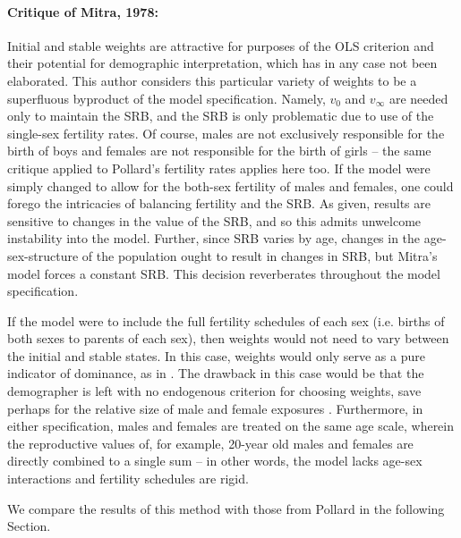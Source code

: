 \paragraph{Critique of Mitra, 1978: } Initial and stable weights are attractive
for purposes of the OLS criterion and their potential for demographic interpretation, which has in any
case not been elaborated. This author considers this particular variety of
weights to be a superfluous byproduct of the model specification. Namely, $v_0$
and $v_\infty$ are needed only to maintain the SRB, and the SRB is
only problematic due to use of the single-sex fertility rates. Of course, males
are not exclusively responsible for the birth of boys and females are not 
responsible for the birth of girls -- the same critique applied to Pollard's
fertility rates applies here too. If the model were simply changed to allow for
the both-sex fertility of males and females, one could forego the
intricacies of balancing fertility and the SRB. As given, results are
sensitive to changes in the value of the SRB, and so this admits
unwelcome instability into the model. Further, since SRB varies by age,
changes in the age-sex-structure of the population ought to result in changes in
SRB, but Mitra's model forces a constant SRB. This decision reverberates
throughout the model specification.

If the model were to include the full fertility schedules of each sex (i.e.
births of both sexes to parents of each sex), then weights would not need to
vary between the initial and stable states. In this case, weights would only serve as a pure indicator of
dominance, as in \citet{goodman1967age}. The drawback in this case would be
that the demographer is left with no endogenous criterion for choosing weights, save
perhaps for the relative size of male and female exposures \citep{mitra1976effect}. 
Furthermore, in either specification, males and females are treated on the same 
age scale, wherein the reproductive values of, for example, 20-year old males
and females are directly combined to a single sum -- in other words, the model
lacks age-sex interactions and fertility schedules are rigid. 

We compare the results of this method with those from Pollard in
the following Section.

\FloatBarrier